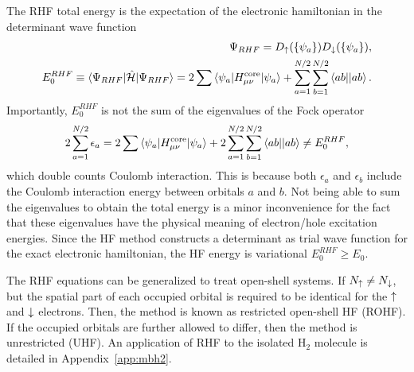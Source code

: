 The RHF total energy is the expectation of the electronic hamiltonian in the determinant wave function
\begin{align}
\Psi_{RHF} = D_{\uparrow}(\{\psi_a\}) D_{\downarrow}(\{\psi_a\}), \\
E^{RHF}_0 \equiv \braket{\Psi_{RHF}|\hat{\mathcal{H}}|\Psi_{RHF}} = 2\sum\limits\braket{\psi_a|H^{\text{core}}_{\mu\nu}|\psi_a} + \sum\limits_{a=1}^{N/2}\sum\limits_{b=1}^{N/2} \braket{ab||ab}.
\end{align}
Importantly, $E^{RHF}_0$ is not the sum of the eigenvalues of the Fock operator
\begin{align} \label{eq:hf-esum}
2\sum\limits_{a=1}^{N/2} \epsilon_a = 2\sum\limits\braket{\psi_a|H^{\text{core}}_{\mu\nu}|\psi_a} + 2\sum\limits_{a=1}^{N/2}\sum\limits_{b=1}^{N/2} \braket{ab||ab} \neq E^{RHF}_0,
\end{align}
which double counts Coulomb interaction. This is because both $\epsilon_a$ and $\epsilon_b$ include the Coulomb interaction energy between orbitals $a$ and $b$.
Not being able to sum the eigenvalues to obtain the total energy is a minor inconvenience for the fact that these eigenvalues have the physical meaning of electron/hole excitation energies.
Since the HF method constructs a determinant as trial wave function for the exact electronic hamiltonian, the HF energy is variational $E^{RHF}_0 \ge E_0$.

The RHF equations can be generalized to treat open-shell systems.
If $N_{\uparrow} \neq N_{\downarrow}$, but the spatial part of each occupied orbital is required to be identical for the $\uparrow$ and $\downarrow$ electrons. Then, the method is known as restricted open-shell HF (ROHF).
If the occupied orbitals are further allowed to differ, then the method is unrestricted (UHF).
An application of RHF to the isolated H$_2$ molecule is detailed in Appendix~\ref{app:mbh2}.


